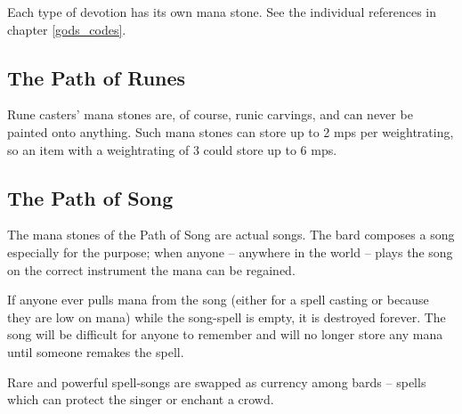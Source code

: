 \begin{multicols}{2}
Each type of devotion has its own mana stone.
See the individual references in chapter \ref{gods_codes}.

\subsection{The Path of Runes}


Rune casters' mana stones are, of course, runic carvings, and can never be painted onto anything.
Such mana stones can store up to 2 \glspl{mp} per \gls{weightrating}, so an item with a \gls{weightrating} of 3 could store up to 6 \glspl{mp}.

\subsection{The Path of Song}
\label{song}

The mana stones of the Path of Song are actual songs.
The bard composes a song especially for the purpose; when anyone -- anywhere in the world -- plays the song on the correct instrument the mana can be regained.

If anyone ever pulls mana from the song (either for a spell casting or because they are low on mana) while the song-spell is empty, it is destroyed forever.
The song will be difficult for anyone to remember and will no longer store any mana until someone remakes the spell.

Rare and powerful spell-songs are swapped as currency among bards -- spells which can protect the singer or enchant a crowd.


  

\end{multicols}

\resumecontents[magic]


